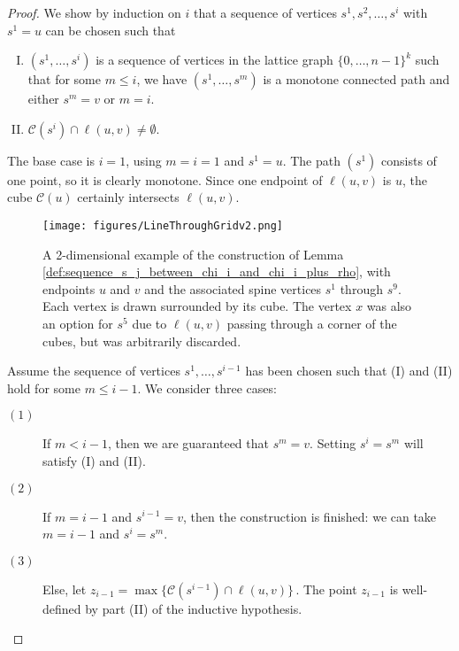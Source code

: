 \documentclass[11pt]{article}
\begin{document}
\lemsequencesjbetweenchis*
\begin{proof}
We show by induction on $i$ that a sequence of vertices $s^1, s^2, \ldots, s^i$ with $s^1 = u$ can be chosen such that 
\begin{enumerate}[(I)]
\item $(s^{1}, \ldots, s^{i})$ is a sequence of vertices in the lattice graph $\{0, \ldots, n-1\}^k$ such that for some $m \leq i$, we have  $(s^1, \ldots, s^m)$ is a monotone connected path  and either $s^m = v$ or $m=i$. 
\item $\mathcal{C}(s^i) \cap \ell(u, v) \neq \emptyset$.
\end{enumerate}

 The base case is $i=1$, using $m=i=1$ and $s^1 = u$. The path $(s^1)$ consists of one point, so it is clearly monotone. Since one endpoint of $\ell(u, v)$ is $u$, the cube  $\mathcal{C}(u)$ certainly intersects $\ell(u, v)$. 

\begin{figure}[h!]
\centering 
\texttt{[image: figures/LineThroughGridv2.png]}
\caption{A 2-dimensional example of the construction of Lemma \ref{def:sequence_s_j_between_chi_i_and_chi_i_plus_rho}, with endpoints $u$ and $v$ and the associated spine vertices $s^1$ through $s^9$. Each vertex is drawn surrounded by its cube. The vertex $x$ was also an option for $s^5$ due to $\ell(u, v)$ passing through a corner of the cubes, but was arbitrarily discarded.}
\label{fig:line-through-grid}
\end{figure}

     Assume the sequence of vertices $s^1, \ldots, s^{i-1}$ has been chosen such that (I) and (II) hold for some $m \leq i-1$. We consider three cases:
     \begin{description} 
     \item[$(1)$] If $m < i-1$, then we are guaranteed that $s^m = v$. Setting $s^i = s^m$ will  satisfy (I) and (II).
     \item[$(2)$] If $m = i-1$ and $s^{i-1} = v$, then the construction is finished: we can take $m = i - 1$ and $s^i = s^m$.
     \item[$(3)$] Else,
     let 
     $ z_{i-1} = \max \{\mathcal{C}({s^{i-1}}) \cap \ell(u, v)\}\,.$ 
     The point $z_{i-1}$ is  well-defined by part (II) of the inductive hypothesis.    %
    


\end{description}
\end{proof}
\end{document}
